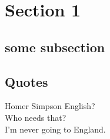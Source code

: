 \section{Section 1}

\blindtext[1]
\subsection{some subsection}

\blindtext[1]



\subsection{Quotes}

\begin{chapquote}{Homer Simpson}
\glqq English? \\Who needs that? \\
I'm never going to England.\grqq
\end{chapquote}
